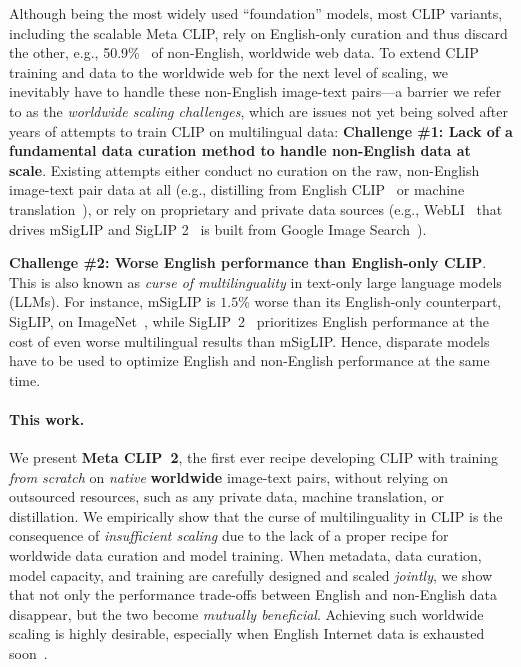 Although being the most widely used ``foundation'' models, most CLIP variants, including the scalable Meta CLIP, rely on English-only curation and thus discard the other, e.g., 50.9\%~\citep{internetLangStats2025} of non-English, worldwide web data. To extend CLIP training and data to the worldwide web for the next level of scaling, we inevitably have to handle these non-English image-text pairs—a barrier we refer to as the \textit{worldwide scaling challenges}, which are issues not yet being solved after years of attempts to train CLIP on multilingual data:
\newpage
\textbf{Challenge \#1: Lack of a fundamental data curation method to handle non-English data at scale}. Existing attempts either conduct no curation on the raw, non-English image-text pair data at all (e.g., distilling from English CLIP~\citep{chen2023mclip} or machine translation~\citep{carlsson2022cross,nguyen2024multilingual}), or rely on proprietary and private data sources (e.g., WebLI~\citep{chen2023pali} that drives mSigLIP and SigLIP 2~\citep{zhai2023sigmoid, tschannen2025siglip} is built from Google Image Search~\citep{juan2019graph}).

\textbf{Challenge \#2: Worse English performance than English-only CLIP}. This is also known as \textit{curse of multilinguality} in text-only large language models (LLMs).
For instance, mSigLIP is \(1.5\)\% worse than its English-only counterpart, SigLIP, on ImageNet~\citep{zhai2023sigmoid}, while SigLIP~2~\citep{tschannen2025siglip} prioritizes English performance at the cost of even worse multilingual results than mSigLIP. Hence, disparate models have to be used to optimize English and non-English performance at the same time.

\paragraph{This work.} We present \textbf{Meta CLIP~2}, the first ever recipe developing CLIP with training \emph{from scratch} on \emph{native} \textbf{worldwide} image-text pairs, without relying on outsourced resources, such as any private data, machine translation, or distillation. We empirically show that the curse of multilinguality in CLIP is the consequence of \emph{insufficient scaling} due to the lack of a proper recipe for worldwide data curation and model training.
When metadata, data curation, model capacity, and training are carefully designed and scaled \emph{jointly}, we show that not only the performance trade-offs between English and non-English data disappear, but the two become \emph{mutually beneficial}. Achieving such worldwide scaling is highly desirable, especially when English Internet data is exhausted soon~\citep{villalobos2022will}.

